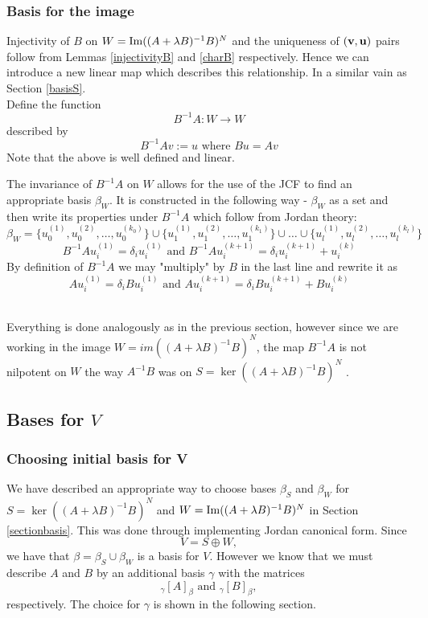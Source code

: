     \subsubsection{Basis for the image}\label{basisW}

    
    Injectivity of $B$ on $W=\operatorname{Im}((A+\lambda B)^{-1}B)^{N}$   and the uniqueness of $(\mathbf{v}, \mathbf{u})$ pairs follow from Lemmas \ref{injectivityB} and \ref{charB} respectively.
    Hence we can introduce a new linear map which describes this relationship.
    In a similar vain as Section \ref{basisS}. \\
    Define the function 
    $$B^{-1}A :W\rightarrow W$$described by $$B^{-1}Av:=u \text{ where }Bu=Av$$
    Note that the above is well defined and linear.

    The invariance of $B^{-1}A$ on $W$  allows for the use of the JCF to find an appropriate basis $\beta_W$. It is constructed in the following way - $\beta_W$ as a set and then write its properties under $B^{-1}A$ which follow from Jordan theory:
    \begin{equation}\label{definitionbw}
\beta_W=\{u_{0}^{(1)},u_{0}^{(2)},\dots,u_{0}^{(k_0)}\} \cup \{u_{1}^{(1)},u_{1}^{(2)},\dots,u_{1}^{(k_1)}\} \cup \dots \cup \{u_{l}^{(1)},u_{l}^{(2)},\dots,u_{l}^{(k_l)}\} 
 \end{equation} $$B^{-1}Au_{i}^{(1)}=\delta_i u_{i}^{(1)}\text{ and }B^{-1}Au_{i}^{(k+1)}=\delta_i u_{i}^{(k+1)}+u_{i}^{(k)}$$ By definition of $B^{-1}A$ we may "multiply" by $B$ in the last line and rewrite it as
    \begin{equation}
        Au_{i}^{(1)}=\delta_i Bu_{i}^{(1)}\text{ and }Au_{i}^{(k+1)}=\delta_i Bu_{i}^{(k+1)}+Bu_{i}^{(k)}
    \end{equation}
    \\

    \begin{remark}
        Everything is done analogously as in the previous section, however since we are working in the image $W=im((A+\lambda B)^{-1}B)^N$, the map $B^{-1}A$ is not nilpotent on $W$ the way $A^{-1}B$ was on $S=\ker((A+\lambda  B)^{-1}B)^N$ .
    \end{remark}
   
\subsection{Bases for $V$}
\subsubsection{Choosing initial basis for V}
We have described an appropriate way to choose bases $\beta_S$ and $\beta_W$ for $S=\ker((A+\lambda B)^{-1}B)^N$ and $W= \operatorname{Im}((A+\lambda B)^{-1}B)^{N}$ in Section \ref{sectionbasis}. This was done through implementing Jordan canonical form.  Since  $$V=S\oplus W,$$ we have that $\beta=\beta_S\cup\beta_W$ is a basis for $V$. However we know that we must describe $A$ and $B$ by an additional basis $\gamma$ with the matrices
$$_\gamma[A]_\beta\text{ and } _\gamma[B]_\beta,  $$respectively. The choice for $\gamma$ is shown in the following section.



